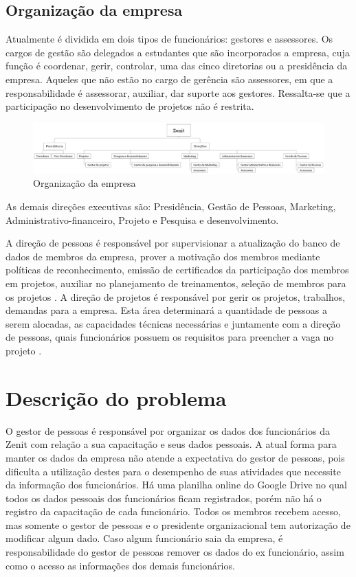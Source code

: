 \subsection{Organização da empresa}
Atualmente é dividida em dois tipos de funcionários: gestores e assessores. Os cargos de gestão são delegados a estudantes que são incorporados a empresa, cuja função é coordenar, gerir, controlar, uma das cinco diretorias ou a presidência da empresa. Aqueles que não estão no cargo de gerência são assessores, em que a responsabilidade é assessorar, auxiliar, dar suporte aos gestores. Ressalta-se que a participação no desenvolvimento de projetos não é restrita.

\begin{figure}[H]
    \centering
    \label{organizacaoZenit}
    \includegraphics[keepaspectratio=true,scale=0.3]{figuras/zenitOrganograma.eps}
    \caption[Organização da empresa]{Organização da empresa}
\end{figure}

As demais direções executivas são: Presidência, Gestão de Pessoas, Marketing, Administrativo-financeiro, Projeto e Pesquisa e desenvolvimento. 

A direção de pessoas é responsável por supervisionar a atualização do banco de dados de membros da empresa, prover a motivação dos membros mediante políticas de reconhecimento, emissão de certificados da participação dos membros em projetos, auxiliar no planejamento de treinamentos, seleção de membros para os projetos \cite{regimentoZenit}.
A direção de projetos é responsável por gerir os projetos, trabalhos, demandas para a empresa. Esta área determinará a quantidade de pessoas a serem alocadas, as capacidades técnicas necessárias e juntamente com a direção de pessoas, quais funcionários possuem os requisitos para preencher a vaga no projeto \cite{regimentoZenit}.

\section{Descrição do problema}
O gestor de pessoas é responsável por organizar os dados dos funcionários da Zenit com relação a sua capacitação e seus dados pessoais. A atual forma para manter os dados da empresa não atende a expectativa do gestor de pessoas, pois dificulta a utilização destes para o desempenho de suas atividades que necessite da informação dos funcionários. Há uma planilha online do Google Drive no qual todos os dados pessoais dos funcionários ficam registrados, porém não há o registro da capacitação de cada funcionário. Todos os membros recebem acesso, mas somente o gestor de pessoas e o presidente organizacional tem autorização de modificar algum dado. Caso algum funcionário saia da empresa, é responsabilidade do gestor de pessoas remover os dados do ex funcionário, assim como o acesso as informações dos demais funcionários.

